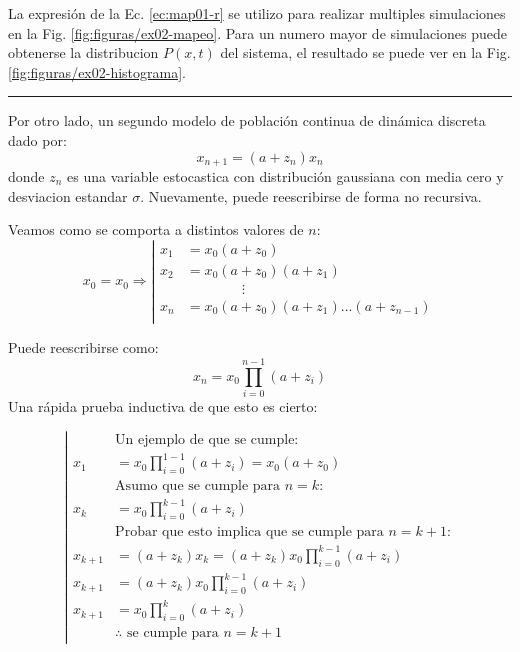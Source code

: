 \documentclass[twocolumn,aps,prl]{revtex4-1}
\newcommand*\sepline{%
  \begin{center}
    \rule[1ex]{.5\textwidth}{.1pt}
  \end{center}}
\begin{document}
La expresión de la Ec. \ref{ec:map01-r} se utilizo para realizar multiples simulaciones en la Fig. \ref{fig:figuras/ex02-mapeo}. Para un numero mayor de simulaciones puede obtenerse la distribucion $P(x,t)$ del sistema, el resultado se puede ver en la Fig. \ref{fig:figuras/ex02-histograma}.
\sepline
Por otro lado, un segundo modelo de población continua de dinámica discreta dado por:
\begin{equation}\label{ec:map02}
  x_{n+1} = (a + z_n) x_n
\end{equation}
donde $z_n$ es una variable estocastica con distribución gaussiana con media cero y desviacion estandar $\sigma$. Nuevamente, puede reescribirse de forma no recursiva.

Veamos como se comporta a distintos valores de $n$:
\begin{equation}
  x_0 = x_0 \Rightarrow
  \left\vert\begin{aligned}
    x_1 &= x_0 (a + z_0) \\
    x_2 &= x_0 (a + z_0) (a + z_1)\\
        & \qquad \qquad \vdots \\
    x_n &= x_0 (a + z_0) (a + z_1) ... (a + z_{n-1})\\
  \end{aligned}\right.
\end{equation}

Puede reescribirse como:
\begin{equation}\label{ec:map02-r}
  x_n = x_0 \prod_{i=0}^{n-1} (a + z_i)
\end{equation}
Una rápida prueba inductiva de que esto es cierto:

\begin{equation}
  \left|
  \begin{aligned}
    & \text{Un ejemplo de que se cumple:} \\
    x_1 &= x_0 \prod_{i=0}^{1-1} (a + z_i) = x_0 (a + z_0)\\
    & \text{Asumo que se cumple para $n=k$:} \\
    x_k &= x_0 \prod_{i=0}^{k-1} (a + z_i)\\
    & \text{Probar que esto implica que se cumple para $n=k+1$:} \\
    x_{k+1} &= (a + z_k) x_k = (a + z_k) x_0 \prod_{i=0}^{k-1} (a + z_i) \\
    x_{k+1} &= (a + z_k) x_0 \prod_{i=0}^{k-1} (a + z_i) \\
    x_{k+1} &= x_0 \prod_{i=0}^{k} (a + z_i) \\
    & \text{$\therefore$ se cumple para $n=k+1$}
  \end{aligned}
  \right.  
\end{equation}
\end{document}
